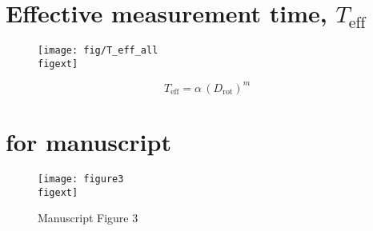 \documentclass{article}
\begin{document}
\section*{Effective measurement time, $T_\mathrm{eff}$}

\begin{minipage}{0.55\textwidth}
\begin{figure}[H]
\texttt{[image: fig/T\_eff\_all\\figext]}
\end{figure}
\end{minipage}
\begin{minipage}{0.25\textwidth}
\begin{equation*}
T_{\mathrm{eff}} = \alpha \, (D_{\mathrm{rot}})^m
\end{equation*}
\end{minipage}\hfill


\section*{for manuscript}
\begin{figure}[H]
\texttt{[image: figure3\\figext]}
\caption*{Manuscript Figure 3}
\end{figure}
\thispagestyle{empty}
\end{document}
